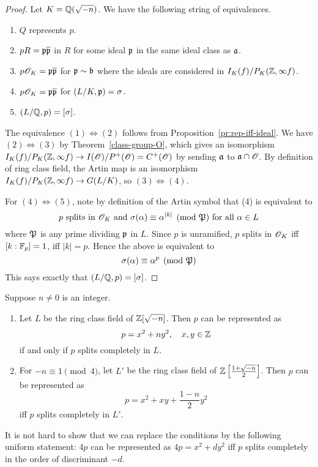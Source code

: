 \begin{proof}
Let $K=\mathbb{Q}(\sqrt{-n})$. 
We have the following string of equivalences.
\begin{enumerate}
\item
$Q$ represents $p$.
\item 
$pR=\mathfrak{p}\overline{\mathfrak{p}}$ in $R$ for some ideal $\mathfrak{p}$ in the same ideal class as $\mathfrak{a}$.
\item
$p\mathscr{O}_K=\mathfrak{p}\overline{\mathfrak{p}}$ for $\mathfrak{p}\sim \mathfrak{b}$ where the ideals are considered in $I_K(f)/P_K(\mathbb{Z},\infty f)$.
\item
$p\mathscr{O}_K=\mathfrak{p}\overline{\mathfrak{p}}$ for $(L/K,\mathfrak{p})=\sigma$.
\item
$(L/\mathbb{Q},p)=[\sigma]$.
\end{enumerate}
%
The equivalence $(1)\iff (2)$ follows from Proposition~\ref{pr:rep-iff-ideal}. 
We have $(2)\iff (3)$ by Theorem~\ref{class-group-O}, which gives an isomorphism $I_K(f)/P_K(\mathbb{Z},\infty f)\to I(\mathscr{O})/P^+(\mathscr{O})=C^+(\mathscr{O})$ by sending $\mathfrak{a}$ to $\mathfrak{a}\cap \mathscr{O}$. 
By definition of ring class field, the Artin map is an isomorphism $I_K(f)/P_{K}(\mathbb{Z},\infty f)\to G(L/K)$, so $(3)\iff (4)$.

For $(4)\iff (5)$, note by definition of the Artin symbol that (4) is equivalent to 
\[
p\text{ splits in $\mathscr{O}_K$ and }\sigma(\alpha)\equiv \alpha^{|k|}\pmod{\mathfrak{P}}
\text{ for all }\alpha\in L
\]
where $\mathfrak{P}$ is any prime dividing $\mathfrak{p}$ in $L$.
Since $p$ is unramified, $p$ splits in $\mathscr{O}_K$ iff $[k:\mathbb{F}_p]=1$, iff $|k|=p$. Hence the above is equivalent to
\[
\sigma(\alpha)\equiv \alpha^{p}\pmod{\mathfrak{P}}
\]
This says exactly that $(L/\mathbb{Q},p)=[\sigma]$.
\end{proof}
\begin{cor}Suppose $n\ne 0$ is an integer. 
\begin{enumerate}
\item
Let $L$ be the ring class field of $\mathbb{Z}[\sqrt{-n}]$. Then $p$ can be represented as
\[
p=x^2+ny^2,\quad x,y\in \mathbb{Z}
\]
if and only if $p$ splits completely in $L$.
\item
For $-n\equiv 1\pmod 4$, let $L'$ be the ring class field of $\mathbb{Z}\left[ {\frac{1+\sqrt{-n}}{2}} \right]$. Then $p$ can be represented as
\[
p=x^2+xy+\frac{1-n}{2}y^2
\]
iff $p$ splits completely in $L'$.
\end{enumerate}
\end{cor}
\begin{rem}
It is not hard to show that we can replace the conditions by the following uniform statement: $4p$ can be represented as $4p=x^2+dy^2$ iff $p$ splits completely in the order of discriminant $-d$. 
\end{rem}
